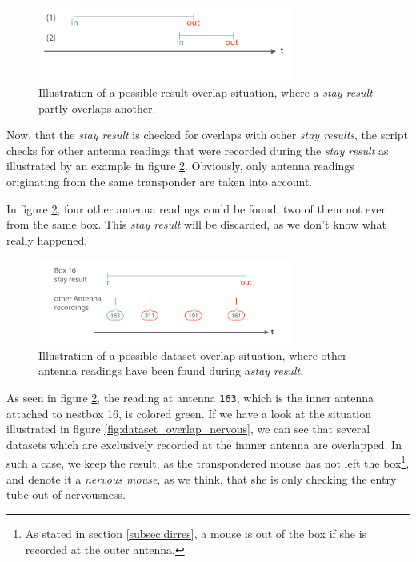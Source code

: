 \begin{figure}[htpb]
\begin{center}
  \includegraphics[width=0.75\textwidth]{assets/pdf/result_overlaps_single_shifted_schema.pdf}
  \caption[Single result partly overlap illustration]{Illustration of a possible result overlap situation, where a \textit{stay result} partly overlaps another.}
  \label{fig:result_overlap_single_shifted}
\end{center}
\end{figure}

Now, that the \textit{stay result} is checked for overlaps with other \textit{stay results}, the script checks for other antenna readings that were recorded during the \textit{stay result} as illustrated by an example in figure \ref{fig:dataset_overlap}. Obviously, only antenna readings originating from the same transponder are taken into account.

In figure \ref{fig:dataset_overlap}, four other antenna readings could be found, two of them not even from the same box. This \textit{stay result} will be discarded, as we don't know what really happened.

\begin{figure}[htpb]
\begin{center}
  \includegraphics[width=0.75\textwidth]{assets/pdf/dataset_overlap_schema.pdf}
  \caption[Dataset overlap illustration]{Illustration of a possible dataset overlap situation, where other antenna readings have been found during a\textit{stay result}.}
  \label{fig:dataset_overlap}
\end{center}
\end{figure}

As seen in figure \ref{fig:dataset_overlap}, the reading at antenna \lstinline|163|, which is the inner antenna attached to nestbox 16, is colored green. If we have a look at the situation illustrated in figure \ref{fig:dataset_overlap_nervous}, we can see that several datasets which are exclusively recorded at the innner antenna are overlapped. In such a case, we keep the result, as the transpondered mouse has not left the box\footnote{As stated in section \ref{subsec:dirres}, a mouse is out of the box if she is recorded at the outer antenna.}, and denote it a \textit{nervous mouse}, as we think, that she is only checking the entry tube out of nervousness.

